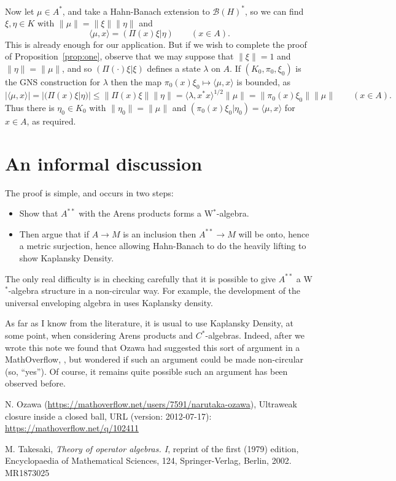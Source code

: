 \documentclass[a4paper,12pt]{article}
\theoremstyle{plain}
\theoremstyle{definition}
\newcommand{\mc}{\mathcal}
\newcommand{\ip}[2]{\langle{#1},{#2}\rangle}
\begin{document}
Now let $\mu\in A^*$, and take a Hahn-Banach extension to $\mc B(H)^*$,
so we can find $\xi,\eta\in K$ with $\|\mu\| = \|\xi\| \|\eta\|$ and
\[ \ip{\mu}{x} = (\Pi(x)\xi|\eta) \qquad (x\in A). \]
This is already enough for our application.  But if we wish to complete the
proof of Proposition~\ref{prop:one}, observe that we may suppose that $\|\xi\|=1$
and $\|\eta\|=\|\mu\|$, and so $(\Pi(\cdot)\xi|\xi)$ defines
a state $\lambda$ on $A$.  If $(K_0,\pi_0,\xi_0)$ is the GNS construction for
$\lambda$ then the map $\pi_0(x)\xi_0 \mapsto \ip{\mu}{x}$ is bounded, as
\[ |\ip{\mu}{x}| = |(\Pi(x)\xi|\eta)| \leq \|\Pi(x)\xi\| \|\eta\|
= \ip{\lambda}{x^*x}^{1/2} \|\mu\|
= \|\pi_0(x)\xi_0\| \|\mu\| \qquad (x\in A). \]
Thus there is $\eta_0\in K_0$ with $\|\eta_0\|=\|\mu\|$ and $(\pi_0(x)\xi_0|\eta_0)
= \ip{\mu}{x}$ for $x\in A$, as required.



\section{An informal discussion}

The proof is simple, and occurs in two steps:

\begin{itemize}
\item Show that $A^{**}$ with the Arens products forms a W$^*$-algebra.
\item Then argue that if $A\rightarrow M$ is an inclusion then $A^{**}\rightarrow
M$ will be onto, hence a metric surjection, hence allowing Hahn-Banach to do the
heavily lifting to show Kaplansky Density.
\end{itemize}

The only real difficulty is in checking carefully that it is possible to give
$A^{**}$ a W$^*$-algebra structure in a non-circular way.  For example, the development
of the universal enveloping algebra in \cite[Chapter~III, Section~2]{tak1} uses
Kaplansky density.

As far as I know from the literature, it is usual to use Kaplansky Density, at some point,
when considering Arens products and $C^*$-algebras.  Indeed, after we wrote this note
we found that Ozawa had suggested this sort of argument in a MathOverflow, \cite{oz},
but wondered if such an argument could be made non-circular (so, ``yes'').  Of course,
it remains quite possible such an argument has been observed before.




\begin{thebibliography}{aa}

 N. Ozawa (\url{https://mathoverflow.net/users/7591/narutaka-ozawa}), Ultraweak closure inside a closed ball, URL (version: 2012-07-17): \url{https://mathoverflow.net/q/102411}

 M. Takesaki, {\it Theory of operator algebras. I}, reprint of the first (1979) edition, Encyclopaedia of Mathematical Sciences, 124, Springer-Verlag, Berlin, 2002. MR1873025

\end{thebibliography}
\end{document}
